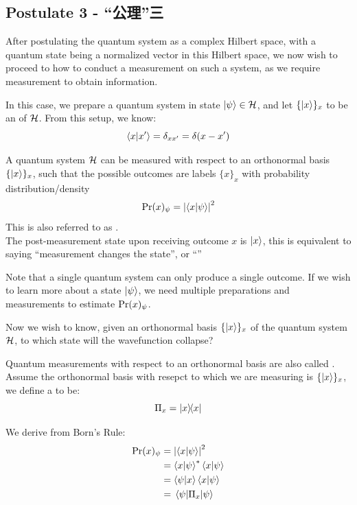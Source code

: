 \subsection{Postulate 3 - “公理”三}
After postulating the quantum system as a complex Hilbert space, with a quantum state being a normalized vector in this Hilbert space, we now wish to proceed to how to conduct a measurement on such a system, as we require measurement to obtain information. \par
In this case, we prepare a quantum system in state $\ket{\psi} \in \mathcal{H}$, and let $\{\ket{x}\}_x$ to be an  of $\mathcal{H}$. From this setup, we know:
$$\braket{x}{x'} = \delta_{xx'} = \delta(x-x')$$
\begin{postulate}
    \raggedright
    A quantum system $\mathcal{H}$ can be measured with respect to an orthonormal basis $\{\ket{x}\}_x$, such that the possible outcomes are labels $\{x\}_x$ with probability distribution/density
    $$ \text{Pr}(x)_\psi = \abs{\braket{x}{\psi}}^2 $$
    This is also referred to as . \\
    The post-measurement state upon receiving outcome $x$ is $\ket{x}$, this is equivalent to saying ``measurement changes the state'', or ``''
\end{postulate}
Note that a single quantum system can only produce a single outcome. If we wish to learn more about a state $\ket{\psi}$, we need multiple preparations and measurements to estimate $\text{Pr}(x)_\psi$. \par
Now we wish to know, given an orthonormal basis $\{\ket{x}\}_x$ of the quantum system $\mathcal{H}$, to which state will the wavefunction collapse?
\begin{definition}
    Quantum measurements with respect to an orthonormal basis are also called . Assume the orthonormal basis with resepct to which we are measuring is $\{\ket{x}\}_x$, we define a  to be:
    $$\proj{x} = \dyad{x}{x}$$
\end{definition}
We derive from Born's Rule:
\begin{align*}
    \text{Pr}(x)_\psi &= \abs{\braket{x}{\psi}}^2 \\
    &= \braket{x}{\psi}^{*}\braket{x}{\psi} \\
    &= \braket{\psi}{x}\braket{x}{\psi} \\
    &= \mel{\psi}{\Pi_{x}}{\psi}
\end{align*}
